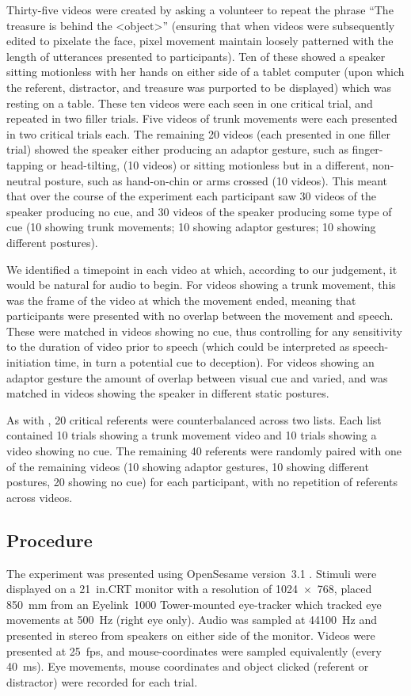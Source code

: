 \documentclass[a4paper,man,natbib]{apa6}
\newcommand*{\spex}[1]{``{#1}''} %
\begin{document}
Thirty-five videos were created by asking a volunteer to repeat the phrase \spex{The treasure is behind the <object>} (ensuring that when videos were subsequently edited to pixelate the face, pixel movement maintain loosely patterned with the length of utterances presented to participants).
Ten of these showed a speaker sitting motionless with her hands on either side of a tablet computer (upon which the referent, distractor, and treasure was purported to be displayed) which was resting on a table.
These ten videos were each seen in one critical trial, and repeated in two filler trials.
Five videos of trunk movements were each presented in two critical trials each.
The remaining 20 videos (each presented in one filler trial) showed the speaker either producing an adaptor gesture, such as finger-tapping or head-tilting, (10 videos) or sitting motionless but in a different, non-neutral posture, such as hand-on-chin or arms crossed (10 videos).
This meant that over the course of the experiment each participant saw 30 videos of the speaker producing no cue, and 30 videos of the speaker producing some type of cue (10 showing trunk movements; 10 showing adaptor gestures; 10 showing different postures).

We identified a timepoint in each video at which, according to our judgement, it would be natural for audio to begin. 
For videos showing a trunk movement, this was the frame of the video at which the movement ended, meaning that participants were presented with no overlap between the movement and speech.
These were matched in videos showing no cue, thus controlling for any sensitivity to the duration of video prior to speech (which could be interpreted as speech-initiation time, in turn a potential cue to deception). 
For videos showing an adaptor gesture the amount of overlap between visual cue and varied, and was matched in videos showing the speaker in different static postures.

As with \citet{Loy2017}, 20 critical referents were counterbalanced across two lists. 
Each list contained 10 trials showing a trunk movement video and 10 trials showing a video showing no cue.
The remaining 40 referents were randomly paired with one of the remaining videos (10 showing adaptor gestures, 10 showing different postures, 20 showing no cue) for each participant, with no repetition of referents across videos.

\subsection{Procedure}
The experiment was presented using OpenSesame version~3.1 \citep{Mathot2012}.
Stimuli were displayed on a 21~in.\@ CRT monitor with a resolution of 1024~$\times$~768, placed 850~mm from an Eyelink~1000 Tower-mounted eye-tracker which tracked eye movements at 500~Hz (right eye only). 
Audio was sampled at 44100~Hz and presented in stereo from speakers on either side of the monitor. 
Videos were presented at 25~fps, and mouse-coordinates were sampled equivalently (every 40~ms).
Eye movements, mouse coordinates and object clicked (referent or distractor) were recorded for each trial.
\end{document}
